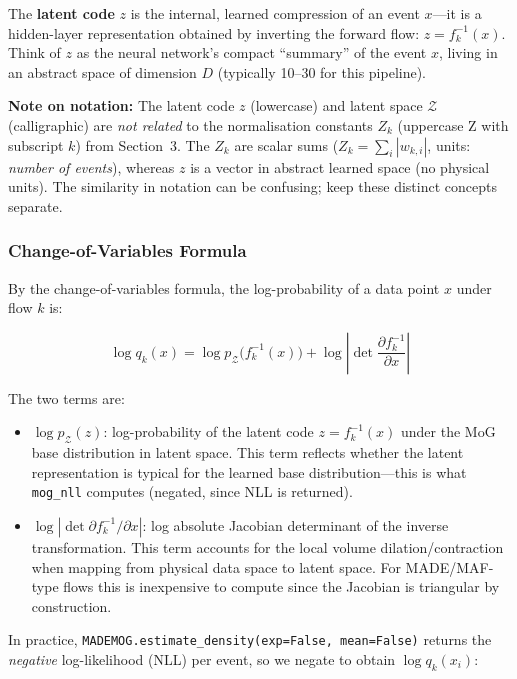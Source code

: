 \documentclass[11pt,a4paper]{article}
\begin{document}
The \textbf{latent code} $z$ is the internal, learned compression of an event $x$---it is a 
hidden-layer representation obtained by inverting the forward flow: $z = f_k^{-1}(x)$.  Think of 
$z$ as the neural network's compact ``summary'' of the event $x$, living in an abstract space 
of dimension $D$ (typically 10--30 for this pipeline).  

\textbf{Note on notation:} The latent code $z$ (lowercase) and latent space $\mathcal{Z}$ (calligraphic) 
are \emph{not related} to the normalisation constants $Z_k$ (uppercase Z with subscript $k$) from 
Section~3.  The $Z_k$ are scalar sums ($Z_k = \sum_i |w_{k,i}|$, units: \emph{number of events}), 
whereas $z$ is a vector in abstract learned space (no physical units).  The similarity in notation 
can be confusing; keep these distinct concepts separate.

\subsubsection{Change-of-Variables Formula}

By the change-of-variables formula, the log-probability of a data point $x$ under flow $k$ is:

\begin{equation}
  \log q_k(x) = \log p_{\mathcal{Z}}\!\bigl(f_k^{-1}(x)\bigr)
                + \log\left|\det\frac{\partial f_k^{-1}}{\partial x}\right|
\end{equation}

The two terms are:
\begin{itemize}
  \item $\log p_{\mathcal{Z}}(z)$: log-probability of the latent code $z = f_k^{-1}(x)$ under the
        MoG base distribution in latent space.  This term reflects whether the latent representation 
        is typical for the learned base distribution---this is what \texttt{mog\_nll} computes (negated, 
        since NLL is returned).
  \item $\log|\det \partial f_k^{-1}/\partial x|$: log absolute Jacobian determinant of the inverse
        transformation.  This term accounts for the local volume dilation/contraction when mapping from 
        physical data space to latent space.  For MADE/MAF-type flows this is inexpensive to compute 
        since the Jacobian is triangular by construction.
\end{itemize}

In practice, \texttt{MADEMOG.estimate\_density(exp=False, mean=False)} returns the \emph{negative}
log-likelihood (NLL) per event, so we negate to obtain $\log q_k(x_i)$:
\end{document}
